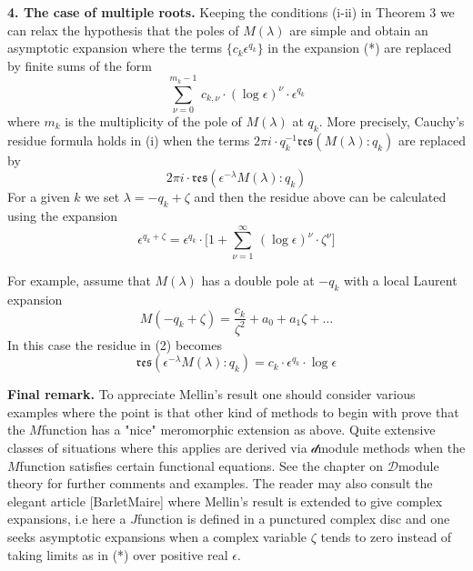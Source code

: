 \bigskip

\noindent
{\bf{4. The case of
multiple roots.}}
Keeping the  conditions (i-ii) in Theorem 3
we can relax the hypothesis that the poles of
$M(\lambda)$ are simple and obtain
an asymptotic expansion where 
the terms $\{c_k\epsilon^{q_k}\}$ in the expansion (*)
are replaced by finite sums of the form
\[ 
\sum_{\nu=0}^{m_k-1}\, c_{k,\nu}\cdot (\log \epsilon)^\nu\cdot \epsilon^{q_k}\tag{1}
\]
where $m_k$ is the multiplicity of the pole of $M(\lambda)$ at $q_k$.
More precisely,
Cauchy's residue formula holds in (i) when the terms
$2\pi i\cdot q_k^{-1}\mathfrak{res}(M(\lambda):q_k)$
are replaced by
\[
2\pi i\cdot \mathfrak{res}(\epsilon^{-\lambda}M(\lambda):q_k)\tag{2}
\]
For a given $k$ we set $\lambda=-q_k+\zeta$
and then the residue above can be calculated
using the expansion
\[
\epsilon ^{q_k+\zeta}=\epsilon^{q_k}\cdot
\bigl [1+\sum_{\nu=1}^\infty
\,(\log \epsilon)^\nu\cdot\zeta^\nu\bigr]
\]


\noindent
For example, assume that $M(\lambda)$ has a double pole at $-q_k$
with a local Laurent expansion
\[
M(-q_k+\zeta)= \frac{c_k}{\zeta^2}+a_0+a_1\zeta+\ldots
\]
In this case the residue in (2) becomes
\[
\mathfrak{res}(\epsilon^{-\lambda}M(\lambda):q_k)=
c_k\cdot \epsilon ^{q_k}\cdot \log\epsilon\tag{3}
\]
\medskip


\noindent
{\bf{Final remark.}}
To appreciate Mellin's result one should consider various examples where
the point is that other kind of methods to begin with prove that
the $M$\vvv function has a "nice" meromorphic extension as above.
Quite extensive classes of situations where this applies are derived via
$\mathcal d$\vvv module methods when
the $M$\vvv function
satisfies certain functional equations.
See the chapter on $\mathcal D$\vvv module theory for 
further comments and examples.
The reader may also consult the elegant article [Barlet\vvv Maire]
where Mellin's result is extended to give complex
expansions, i.e here a $J$\vvv function is defined in a punctured complex disc
and one seeks asymptotic expansions
when a complex variable $\zeta$ tends to zero instead of 
taking limits as in (*) over positive real $\epsilon$.










 




%











 




 




